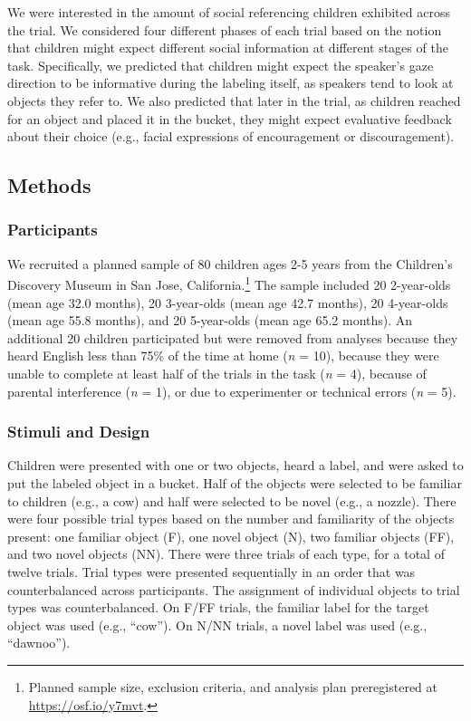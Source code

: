 \documentclass[a4paper,man,apacite,floatsintext]{apa6}
\begin{document}
We were interested in the amount of social referencing children
exhibited across the trial. We considered four different phases of each
trial based on the notion that children might expect different social
information at different stages of the task. Specifically, we predicted
that children might expect the speaker's gaze direction to be
informative during the labeling itself, as speakers tend to look at
objects they refer to. We also predicted that later in the trial, as
children reached for an object and placed it in the bucket, they might
expect evaluative feedback about their choice (e.g., facial expressions
of encouragement or discouragement).

\subsection{Methods}\label{methods}

\subsubsection{Participants}\label{participants}

We recruited a planned sample of 80 children ages 2-5 years from the
Children's Discovery Museum in San Jose, California.\footnote{Planned
  sample size, exclusion criteria, and analysis plan preregistered at
  \url{https://osf.io/y7mvt}.} The sample included 20 2-year-olds (mean
age 32.0 months), 20 3-year-olds (mean age 42.7 months), 20 4-year-olds
(mean age 55.8 months), and 20 5-year-olds (mean age 65.2 months). An
additional 20 children participated but were removed from analyses
because they heard English less than 75\% of the time at home (\emph{n}
= 10), because they were unable to complete at least half of the trials
in the task (\emph{n} = 4), because of parental interference (\emph{n} =
1), or due to experimenter or technical errors (\emph{n} = 5).

\subsubsection{Stimuli and Design}\label{stimuli-and-design}

Children were presented with one or two objects, heard a label, and were
asked to put the labeled object in a bucket. Half of the objects were
selected to be familiar to children (e.g., a cow) and half were selected
to be novel (e.g., a nozzle). There were four possible trial types based
on the number and familiarity of the objects present: one familiar
object (F), one novel object (N), two familiar objects (FF), and two
novel objects (NN). There were three trials of each type, for a total of
twelve trials. Trial types were presented sequentially in an order that
was counterbalanced across participants. The assignment of individual
objects to trial types was counterbalanced. On F/FF trials, the familiar
label for the target object was used (e.g., ``cow''). On N/NN trials, a
novel label was used (e.g., ``dawnoo'').
\end{document}
